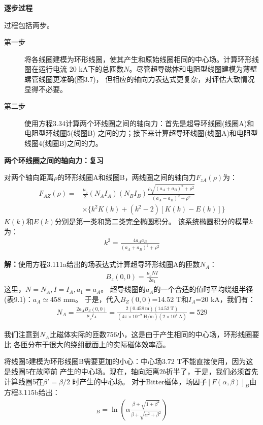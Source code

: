 \textbf{逐步过程}

过程包括两步。
\begin{description}
	\item[第一步] 将各线圈建模为环形线圈，使其产生和原始线圈相同的中心场。计算环形线圈在运行电流
	20 kA下的总匝数$N$。尽管超导磁体和电阻型线圈建模为薄壁螺管线圈更准确(图3.7)，
	但相应的轴向力表达式更复杂，对评估大致情况显得不必要。
\item[第二步] 使用方程3.34计算两个环线圈之间的轴向力：首先是超导环线圈(线圈A)和电阻型环线圈5(线圈B)
之间的力；接下来计算超导环线圈(线圈A)和电阻型线圈4(线圈B)之间的力。
\end{description}

\textbf{两个环线圈之间的轴向力：复习}

对两个轴向距离$\rho$的环形线圈A和线圈B，两线圈之间的轴向力$F_{zA}(\rho)$为：
\begin{align*}%
F_{AZ}(\rho)=&\frac{\mu_o}{2}(N_AI_A)(N_BI_B)\frac{\rho\sqrt{(a_A+a_B)^2+\rho^2}}{(a_A-a_B)^2+\rho^2}\\
&\times\{k^2K(k)+(k^2-2)[K(k)-E(k)]\} \tag{3.34}
\end{align*}
$K(k)$和$E(k)$分别是第一类和第二类完全椭圆积分。
该系统椭圆积分的模量$k$为：
\begin{align*}%
k^2=\frac{4a_Aa_B}{(a_A+a_B)^2+\rho^2} \tag{3.36}
\end{align*}

\textbf{解：}使用方程3.111a给出的场表达式计算超导环形线圈A的匝数$N_A$：
\begin{align*}%
B_z(0,0)=\frac{\mu_oNI}{2a_1} \tag{3.111a}
\end{align*}
这里，$N=N_A,I=I_A, a_1=a_A$。
超导线圈的$a_A$的一个合适的值时平均绕组半径(表9.1)：$a_A\simeq$458 mm。
于是，代入$B_Z(0,0)$=14.52 T和$I_A$=20 kA，我们有：
\begin{align*}%
N_A=\frac{2a_AB_Z(0,0)}{\mu_oI_A}=\frac{2(0.458\ \mathrm{m})(14.52\ \mathrm{T})}{(4\pi\times 10^{-7}\ \mathrm{H/m})(2\times 10^4\ \mathrm{A})}=529
\end{align*}

我们注意到$N_A$比磁体实际的匝数756小，这是由于产生相同的中心场，环形线圈要比
各匝分布于很大的绕组截面上的实际磁体效率高。

将线圈5建模为环形线圈B需要更加的小心：中心场3.72 T不能直接使用，因为这是线圈5在故障前
产生的中心场。现在，轴向距离$2b$折半了，于是，我们必须首先计算线圈5在$\beta'=\beta/2$
时产生的中心场。
对于Bitter磁体，场因子$[F(\alpha,\beta)]_B$由方程3.115b给出：
\begin{align*}%
[F(\alpha,\beta)]_B=\ln(\alpha\frac{\beta+\sqrt{1+\beta^2}}{\beta+\sqrt{\alpha^2+\beta^2}}) \tag{3.115b}
\end{align*}

